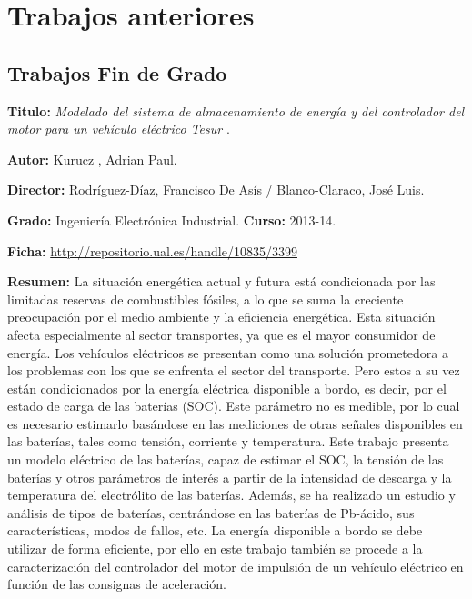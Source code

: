 \chapter{Trabajos anteriores}
\section{Trabajos Fin de Grado}
\textbf{Titulo:} \textit{Modelado del sistema de almacenamiento de energía y del controlador del motor para un vehículo eléctrico Tesur} \cite{kurucz2014Tesur}.

\textbf{Autor:} Kurucz , Adrian Paul.

\textbf{Director:} Rodríguez-Díaz, Francisco De Asís / Blanco-Claraco, José Luis.

\textbf{Grado:} Ingeniería Electrónica Industrial. \textbf{Curso:} 2013-14. 

\textbf{Ficha:} \url{http://repositorio.ual.es/handle/10835/3399}
 
\textbf{Resumen:} La situación energética actual y futura está condicionada por las limitadas reservas de combustibles fósiles, a lo que se suma la creciente preocupación por el medio ambiente y la eficiencia energética. Esta situación afecta especialmente al sector transportes, ya que es el mayor consumidor de energía. Los vehículos eléctricos se presentan como una solución prometedora a los problemas con los que se enfrenta el sector del transporte. Pero estos a su vez están condicionados por la energía eléctrica disponible a bordo, es decir, por el estado de carga de las baterías (SOC). Este parámetro no es medible, por lo cual es necesario estimarlo basándose en las mediciones de otras señales disponibles en las baterías, tales como tensión, corriente y temperatura. Este trabajo presenta un modelo eléctrico de las baterías, capaz de estimar el SOC, la tensión de las baterías y otros parámetros de interés a partir de la intensidad de descarga y la temperatura del electrólito de las baterías. Además, se ha realizado un estudio y análisis de tipos de baterías, centrándose en las baterías de Pb-ácido, sus características, modos de fallos, etc. La energía disponible a bordo se debe utilizar de forma eficiente, por ello en este trabajo también se procede a la caracterización del controlador del motor de impulsión de un vehículo eléctrico en función de las consignas de aceleración. 

